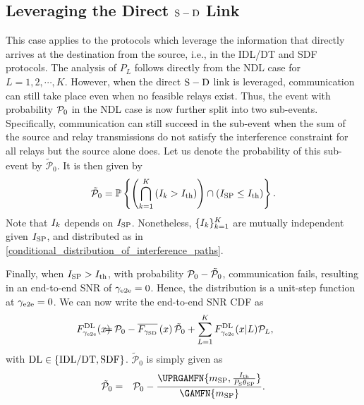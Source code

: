 \documentclass[10pt,journal]{IEEEtran}
\begin{document}
\subsection{Leveraging the Direct ${\rm S} - {\rm D}$ Link}
This case applies to the protocols which leverage the information that directly arrives at the destination from the source, i.e., in the \ac{IDL}/\ac{DT} and \ac{SDF} protocols. The analysis of $P_L$ follows directly from the \ac{NDL} case for $L=1,2,\cdots,K$. However, when the direct ${{\rm S} - {\rm D}}$ link is leveraged, communication can still take place even when no feasible relays exist. Thus, the event with probability $\mathcal{P}_0$ in the \ac{NDL} case is now further split into two sub-events. Specifically, communication can still succeed in the sub-event when the sum of the source and relay transmissions do not satisfy the interference constraint for all relays but the source alone does. Let us denote the probability of this sub-event by $\tilde{\mathcal{P}}_0$. It is then given by
\begin{eqnarray}
\tilde{\mathcal{P}}_0=\mathbb{P}\left\{\left(\displaystyle\bigcap_{k=1}^K \left(I_{k}>I_{\rm th}\right)\right) \cap \left(I_{{\rm S} {\rm P}}\leq I_{\rm th}\right)\right\}.
\end{eqnarray}
Note that $I_{k}$ depends on $I_{{\rm S} {\rm P}}$. Nonetheless, $\{I_{k}\}_{k=1}^K$ are mutually independent given $I_{{\rm S} {\rm P}}$, and distributed as in \eqref{conditional_distribution_of_interference_paths}.

Finally, when $I_{{\rm S} {\rm P}}>I_{\rm th}$, with probability $\mathcal{P}_0-\tilde{\mathcal{P}}_0$, communication fails, resulting in an end-to-end \ac{SNR} of $\gamma_{\rm e2e}=0$. Hence, the distribution is a unit-step function at $\gamma_{\rm e2e}=0$. We can now write the end-to-end \ac{SNR} \ac{CDF} as
\begin{eqnarray}
\!\!\!\!\!\!\!\!\!\!F^{\rm DL}_{\etoeFDSNR}(\RVval)
\!\!\!\!\!&=&\!\!\!\!\! \Pzero-\overline{F_{\SDFDSNR}}\left(\RVval\right)\tilde{\mathcal{P}}_0
+\sum_{L=1}^K F^{\rm DL}_{\etoeFDSNR}(\RVval \vert L) \PL,
\end{eqnarray}
with ${\rm DL} \in \{\rm IDL/DT, SDF\}$. $\tilde{\mathcal{P}}_0$ is simply given as
\begin{eqnarray}
\tilde{\mathcal{P}}_0
&=& \Pzero - \frac{\UPRGAMFN{\msp,\frac{\Ith}{\PS\thetasp}}}{\GAMFN{\msp}}.
\end{eqnarray}
\end{document}

